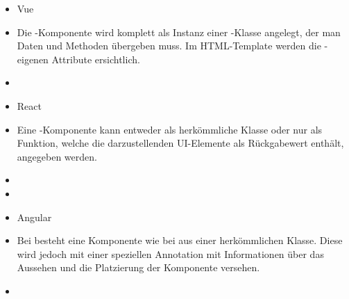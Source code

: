 \begin{itemize}
    \captionsetup{justification=centering}
    \item{Vue}
    \item[] Die -Komponente wird komplett als Instanz einer -Klasse angelegt, der man Daten und Methoden übergeben muss. Im HTML-Template werden die -eigenen Attribute ersichtlich.
    \item[] 
    \item{React}
    \item[] Eine -Komponente kann entweder als herkömmliche Klasse oder nur als Funktion, welche die darzustellenden UI-Elemente als Rückgabewert enthält, angegeben werden.
    \item[] 
    \item[] 
    \item{Angular}
    \item[] Bei  besteht eine Komponente wie bei  aus einer herkömmlichen Klasse. Diese wird jedoch mit einer speziellen Annotation mit Informationen über das Aussehen und die Platzierung der Komponente versehen.
    \item[] 
\end{itemize}

